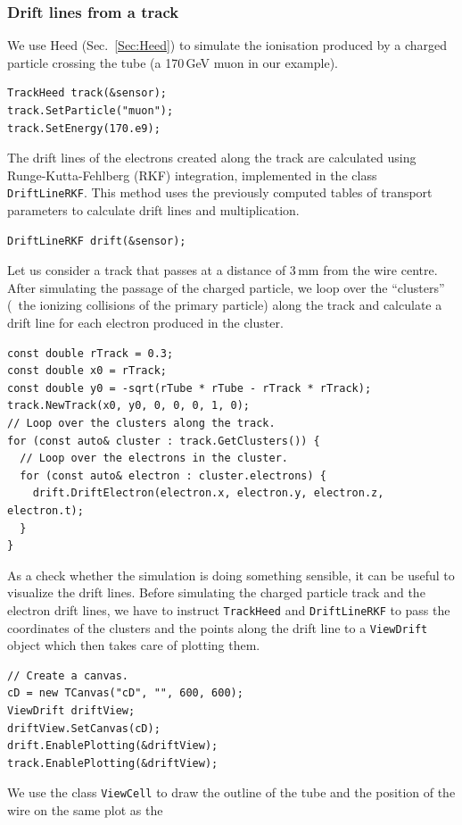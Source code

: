 \subsubsection{Drift lines from a track}
We use Heed (Sec.~\ref{Sec:Heed}) to simulate the ionisation 
produced by a charged particle crossing the tube 
(a 170\,GeV muon in our example).
\begin{lstlisting}
TrackHeed track(&sensor);
track.SetParticle("muon");
track.SetEnergy(170.e9);
\end{lstlisting}
The drift lines of the electrons created along the track are calculated 
using Runge-Kutta-Fehlberg (RKF) integration,
implemented in the class \texttt{DriftLineRKF}.
This method uses the previously computed tables of transport parameters to 
calculate drift lines and multiplication. 
\begin{lstlisting}
DriftLineRKF drift(&sensor);
\end{lstlisting}
Let us consider a track that passes at a distance of 3\,mm
from the wire centre. After simulating the passage of the charged particle,
we loop over the ``clusters'' 
(\ie~the ionizing collisions of the primary particle)
along the track and calculate a drift line for each electron produced in 
the cluster.
\begin{lstlisting}
const double rTrack = 0.3;
const double x0 = rTrack;
const double y0 = -sqrt(rTube * rTube - rTrack * rTrack);
track.NewTrack(x0, y0, 0, 0, 0, 1, 0);
// Loop over the clusters along the track.
for (const auto& cluster : track.GetClusters()) {
  // Loop over the electrons in the cluster.
  for (const auto& electron : cluster.electrons) {
    drift.DriftElectron(electron.x, electron.y, electron.z, electron.t);
  }
}
\end{lstlisting}
As a check whether the simulation is doing something sensible, 
it can be useful to visualize the drift lines. 
Before simulating the charged particle track and
the electron drift lines, we have to instruct \texttt{TrackHeed} and
\texttt{DriftLineRKF} to pass the coordinates of the clusters and the 
points along the drift line to a \texttt{ViewDrift} object
which then takes care of plotting them.
\begin{lstlisting}
// Create a canvas.
cD = new TCanvas("cD", "", 600, 600);
ViewDrift driftView;
driftView.SetCanvas(cD);
drift.EnablePlotting(&driftView);
track.EnablePlotting(&driftView);
\end{lstlisting}
We use the class \texttt{ViewCell} to draw the
outline of the tube and the position of the wire on the same plot as the
